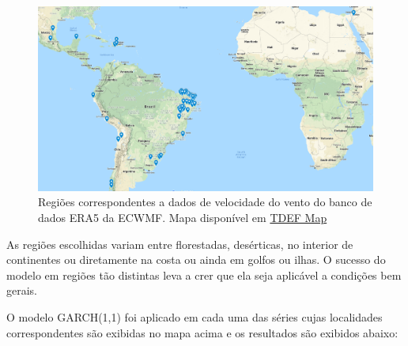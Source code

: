 \documentclass[
	12pt,				%
	openright,			%
	oneside,			%
	a4paper,			%
	english,			%
	french,				%
	spanish,			%
	brazil				%
	]{abntex2}
\begin{document}
\begin{figure}[h]
    \centering
	\includegraphics[width=\textwidth]{latam}
	\caption{Regiões correspondentes a dados de velocidade do vento do banco de dados ERA5 da ECWMF. Mapa disponível em \href{https://drive.google.com/open?id=1BhnfX52bhdIj7LbBzX_KbzbSS-oIQXiD&usp=sharing}{TDEF Map}}
\end{figure}
\FloatBarrier

As regiões escolhidas variam entre florestadas, desérticas, no interior de continentes ou diretamente na costa ou ainda em golfos ou ilhas. O sucesso do modelo em regiões tão distintas leva a crer que ela seja aplicável a condições bem gerais.

O modelo GARCH(1,1) foi aplicado em cada uma das séries cujas localidades correspondentes são exibidas no mapa acima e os resultados são exibidos abaixo:
\end{document}
